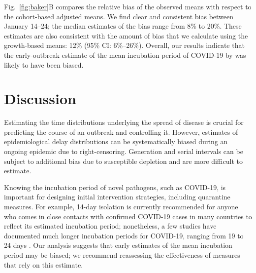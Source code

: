 \documentclass[12pt]{article}
\newcommand{\fref}[1]{Fig.~\ref{fig:#1}}
\begin{document}
\fref{baker}B compares the relative bias of the observed means with respect to the cohort-based adjusted means.
We find clear and consistent bias between January 14--24;
the median estimates of the bias range from 8\% to 20\%.
These estimates are also consistent with the amount of bias that we calculate using the growth-based means: 12\% (95\% CI: 6\%--26\%).
Overall, our results indicate that the early-outbreak estimate of the mean incubation period of COVID-19 by \cite{backer2020incubation} was likely to have been biased.


\section{Discussion}

Estimating the time distributions underlying the spread of disease is crucial for predicting the course of an outbreak and controlling it.
However, estimates of epidemiological delay distributions can be systematically biased during an ongoing epidemic due to right-censoring.
Generation and serial intervals can be subject to additional bias due to susceptible depletion and are more difficult to estimate.

Knowing the incubation period of novel pathogens, such as COVID-19, is important for designing initial intervention strategies, including quarantine measures.
For example, 14-day isolation is currently recommended for anyone who comes in close contacts with confirmed COVID-19 cases in many countries to reflect its estimated incubation period;
nonetheless, a few studies have documented much longer incubation periods for COVID-19, ranging from 19 to 24 days \citep{bai2020presumed, guan2020clinical}.
Our analysis suggests that early estimates of the mean incubation period may be biased;
we recommend reassessing the effectiveness of measures that rely on this estimate.
\end{document}

